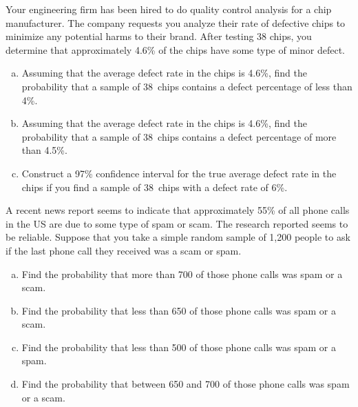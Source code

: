 \documentclass[11pt,letterpaper]{article}
\begin{document}

 Your engineering firm has been hired to do quality control analysis for a chip manufacturer. The company requests you analyze their rate of defective chips to minimize any potential harms to their brand. After testing 38 chips, you determine that approximately 4.6\% of the chips have some type of minor defect. 
	\begin{enumerate}[(a)]
	\item Assuming that the average defect rate in the chips is 4.6\%, find the probability that a sample of 38~chips contains a defect percentage of less than 4\%.
	 \item Assuming that the average defect rate in the chips is 4.6\%, find the probability that a sample of 38~chips contains a defect percentage of more than 4.5\%. 
	 \item Construct a 97\% confidence interval for the true average defect rate in the chips if you find a sample of 38~chips with a defect rate of 6\%. 
	\end{enumerate} 



\newpage



 A recent news report seems to indicate that approximately 55\% of all phone calls in the US are due to some type of spam or scam. The research reported seems to be reliable. Suppose that you take a simple random sample of 1,200 people to ask if the last phone call they received was a scam or spam. 
	\begin{enumerate}[(a)]
	\item Find the probability that more than 700 of those phone calls was spam or a scam. 
	\item Find the probability that less than 650 of those phone calls was spam or a scam.
	\item Find the probability that less than 500 of those phone calls was spam or a spam.
	\item Find the probability that between 650 and 700 of those phone calls was spam or a scam.  
	\end{enumerate}
\end{document}
